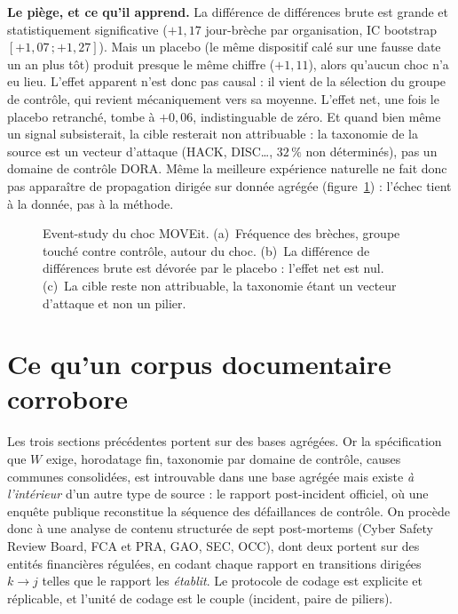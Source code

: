 \begin{attention}
\textbf{Le piège, et ce qu'il apprend.} La différence de différences brute est grande et
statistiquement significative ($+1{,}17$ jour-brèche par organisation, IC bootstrap
$[+1{,}07\,;+1{,}27]$). Mais un placebo (le même dispositif calé sur une fausse
date un an plus tôt) produit presque le même chiffre ($+1{,}11$), alors qu'aucun choc n'a
eu lieu. L'effet apparent n'est donc pas causal : il vient de la sélection du groupe de
contrôle, qui revient mécaniquement vers sa moyenne. L'effet net, une fois le
placebo retranché, tombe à $+0{,}06$, indistinguable de zéro. Et quand bien même un signal
subsisterait, la cible resterait non attribuable : la taxonomie de la source est un vecteur
d'attaque (HACK, DISC\dots, $32\,\%$ non déterminés), pas un domaine de contrôle DORA. Même
la meilleure expérience naturelle ne fait donc pas apparaître de propagation dirigée sur
donnée agrégée (figure~\ref{fig:moveit}) : l'échec tient à la donnée, pas à la méthode.
\end{attention}

\begin{figure}[htbp]
\centering
{}
\caption{Event-study du choc MOVEit. (a)~Fréquence des brèches, groupe touché contre
contrôle, autour du choc. (b)~La différence de différences brute est dévorée par le
placebo : l'effet net est nul. (c)~La cible reste non attribuable, la taxonomie étant un
vecteur d'attaque et non un pilier.}
\label{fig:moveit}
\end{figure}


\section{Ce qu'un corpus documentaire corrobore}
\label{sec:postmortems}

Les trois sections précédentes portent sur des bases agrégées. Or la spécification que
$W$ exige, horodatage fin, taxonomie par domaine de contrôle, causes communes consolidées, est
introuvable dans une base agrégée mais existe \emph{à l'intérieur} d'un autre type de source :
le rapport post-incident officiel, où une enquête publique reconstitue la séquence des
défaillances de contrôle. On procède donc à une analyse de contenu structurée de sept
post-mortems (Cyber Safety Review Board, FCA et PRA, GAO, SEC, OCC), dont deux portent sur des
entités financières régulées, en codant chaque rapport en transitions dirigées $k \to j$ telles
que le rapport les \emph{établit}. Le protocole de codage est explicite et réplicable, et
l'unité de codage est le couple (incident, paire de piliers).

